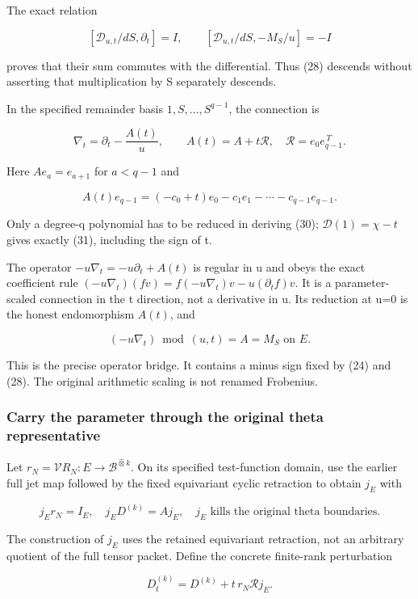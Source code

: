 \documentclass[
  11pt,
]{article}
\begin{document}
The exact relation

\[
[\mathcal D_{u,t}/dS,\partial_t]=I,
\qquad
[\mathcal D_{u,t}/dS,-M_S/u]=-I
\tag{29}
\]

proves that their sum commutes with the differential. Thus (28) descends
without asserting that multiplication by S separately descends.

In the specified remainder basis \(1,S,\ldots,S^{q-1}\), the connection
is

\[
\boxed{\nabla_t=\partial_t-\frac{A(t)}u,
\qquad A(t)=A+t\mathcal R,\quad
\mathcal R=e_0e_{q-1}^{\,T}.}
\tag{30}
\]

Here \(A e_a=e_{a+1}\) for \(a<q-1\) and

\[
A(t)e_{q-1}=(-c_0+t)e_0-c_1e_1-\cdots-c_{q-1}e_{q-1}.
\tag{31}
\]

Only a degree-q polynomial has to be reduced in deriving (30);
\(\mathcal D(1)=\chi-t\) gives exactly (31), including the sign of t.

The operator \(-u\nabla_t=-u\partial_t+A(t)\) is regular in u and obeys
the exact coefficient rule
\((-u\nabla_t)(fv)=f(-u\nabla_t)v-u(\partial_t f)v\). It is a
parameter-scaled connection in the t direction, not a derivative in u.
Its reduction at u=0 is the honest endomorphism \(A(t)\), and

\[
\boxed{(-u\nabla_t)\bmod(u,t)=A=M_S\text{ on }E.}
\tag{32}
\]

This is the precise operator bridge. It contains a minus sign fixed by
(24) and (28). The original arithmetic scaling is not renamed Frobenius.

\subsubsection{Carry the parameter through the original theta
representative}\label{carry-the-parameter-through-the-original-theta-representative}

Let \(r_N=\mathcal V R_N:E\to\mathscr B^{\widehat\otimes k}\). On its
specified test-function domain, use the earlier full jet map followed by
the fixed equivariant cyclic retraction to obtain \(j_E\) with

\[
j_Er_N=I_E,\quad j_ED^{(k)}=Aj_E,
\quad j_E\text{ kills the original theta boundaries}.
\tag{33}
\]

The construction of \(j_E\) uses the retained equivariant retraction,
not an arbitrary quotient of the full tensor packet. Define the concrete
finite-rank perturbation

\[
\boxed{D_t^{(k)}=D^{(k)}+t\,r_N\mathcal R j_E.}
\tag{34}
\]
\end{document}
